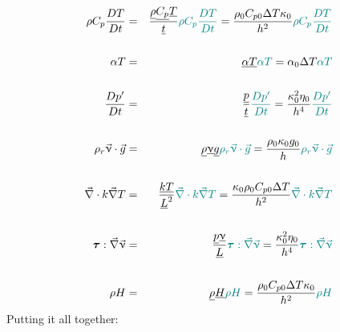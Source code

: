 \documentclass[a4paper,11pt]{article}
\newcommand{\nn}{\nonumber}
\begin{document}
\begin{eqnarray}
\rho C_p \frac{DT}{Dt}
&=& 
\frac{\underline{\rho} \underline{C_p} \underline{T} }{\underline{t}}
{\color{teal} \rho C_p \frac{DT}{Dt}} 
= \frac{\rho_0 C_{p0} \Delta T \kappa_0}{h^2}
{\color{teal} \rho C_p \frac{DT}{Dt}} 
\nn\\
\nn\\
\alpha T 
&=& \underline{\alpha}\underline{T} {\color{teal} \alpha T } 
= \alpha_0 \Delta T {\color{teal} \alpha T } 
\nn\\
\nn\\
\frac{Dp'}{Dt} 
&=&
\frac{\underline{p}}{\underline{t}} {\color{teal} \frac{Dp'}{Dt} } 
= \frac{ \kappa_0^2 \eta_0}{h^4 } {\color{teal} \frac{Dp'}{Dt} } 
\nn\\
\nn\\
\rho_r \vec\upnu \cdot \vec{g} 
&=& 
\underline{\rho} \underline{\upnu}\underline{g}
{\color{teal} \rho_r \vec\upnu \cdot \vec{g} } 
=
\frac{\rho_0 \kappa_0 g_0}{h }
{\color{teal} \rho_r \vec\upnu \cdot \vec{g} } 
\nn\\
\nn\\
\vec\nabla \cdot k \vec\nabla T
&=& 
\frac{\underline{k} \underline{T}}{\underline{L}^2}
{\color{teal} \vec\nabla \cdot k \vec\nabla T} 
=
\frac{\kappa_0 \rho_0 C_{p0} \Delta T}{h^2}
{\color{teal} \vec\nabla \cdot k \vec\nabla T}
\nn\\
\nn\\
{\bm \tau} : \vec\nabla \vec\upnu
&=& \frac{\underline{p} \underline{\upnu}}{\underline{L}}
{\color{teal} {\bm \tau} : \vec\nabla \vec\upnu} 
=
\frac{\kappa_0^2 \eta_0}{h^4}
{\color{teal} {\bm \tau} : \vec\nabla \vec\upnu} 
\nn\\
\nn\\
\rho H 
&=& 
\underline{\rho} \underline{H} 
{\color{teal} \rho H }
=\frac{\rho_0 C_{p0} \Delta T \kappa_0 }{h^2}
{\color{teal} \rho H } \nn
\end{eqnarray}
Putting it all together:
\end{document}
